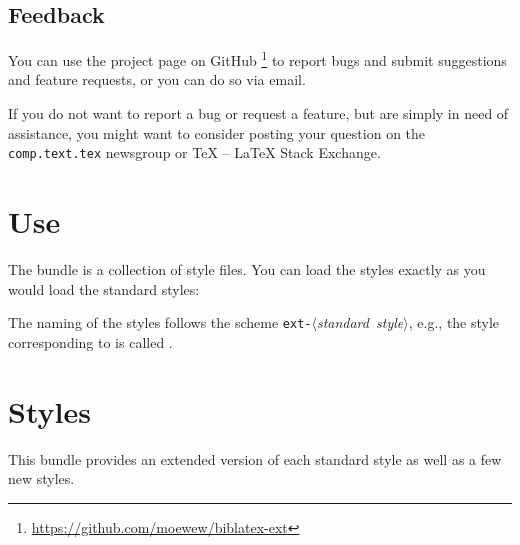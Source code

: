 \documentclass[DIV=9]{scrartcl}
\def\tex{TeX}%
\def\latex{LaTeX}%
\newcommand*{\gitbaseurl}{https://github.com/moewew/biblatex-ext}
\begin{document}
\subsection{Feedback}\label{sec:feedback}
You can use the  project page on GitHub%
\footnote{\url{\gitbaseurl}} to report bugs and
submit suggestions and feature requests, or you can do so via email.

If you do not want to report a bug or request a feature, but are simply in need
of assistance, you might want to consider posting your question on the
\texttt{comp.text.tex} newsgroup or \tex{} -- \latex{} Stack Exchange.%

\section{Use}\label{sec:use}
The  bundle is a collection of  style files.
You can load the styles exactly as you would load the standard styles:
\begin{biblatexcode}
\usepackage[style=(*@$\langle$\normalfont\emph{style}$\rangle$@*)]{biblatex}
\end{biblatexcode}
The naming of the styles follows the scheme
\mbox{\texttt{ext-}$\langle$\emph{standard style}$\rangle$}, e.g.,
the style corresponding to  is called
.

\section{Styles}\label{sec:styles}
This bundle provides an extended version of each standard style as well as a
few new styles.
\end{document}
